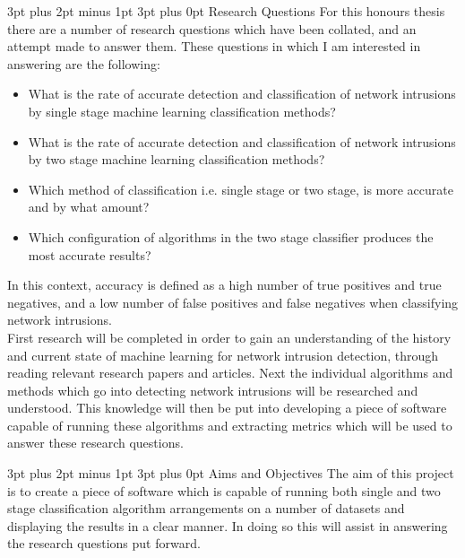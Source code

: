 \documentclass[12pt,a4paper]{article}
\makeatletter
\renewcommand\subsection{\@startsection {subsection}{1}{2mm} %
      {3pt plus 2pt minus 1pt} %
      {3pt plus 0pt} %
      {\normalfont\bfseries}}
\makeatother
\begin{document}
\subsection{Research Questions}
	For this honours thesis there are a number of research questions which have been collated, and an attempt made to answer them. These questions in which I am interested in answering are the following: 
		
		\begin{itemize}
			\item What is the rate of accurate detection and classification of network intrusions by single stage machine learning classification methods?
			\item What is the rate of accurate detection and classification of network intrusions by two stage machine learning classification methods?
			\item Which method of classification i.e. single stage or two stage, is more accurate and by what amount?
			\item Which configuration of algorithms in the two stage classifier produces the most accurate results?
		\end{itemize}
		
In this context, accuracy is defined as a high number of true positives and true negatives, and a low number of false positives and false negatives when classifying network intrusions. \\

	First research will be completed in order to gain an understanding of the history and current state of machine learning for network intrusion detection, through reading relevant research papers and articles. Next the individual algorithms and methods which go into detecting network intrusions will be researched and understood. This knowledge will then be put into developing a piece of software capable of running these algorithms and extracting metrics which will be used to answer these research questions.

\subsection{Aims and Objectives}
	The aim of this project is to create a piece of software which is capable of running both single and two stage classification algorithm arrangements on a number of datasets and displaying the results in a clear manner. In doing so this will assist in answering the research questions put forward.
\end{document}
